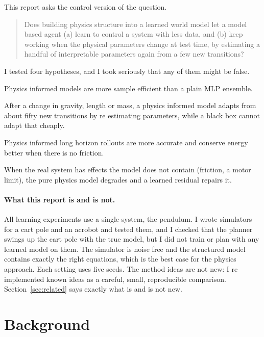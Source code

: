 \documentclass[11pt,a4paper]{article}
\begin{document}
This report asks the control version of the question.

\begin{quote}
Does building physics structure into a learned world model let a model based agent (a) learn to control a system with less data, and (b) keep working when the physical parameters change at test time, by estimating a handful of interpretable parameters again from a few new transitions?
\end{quote}

I tested four hypotheses, and I took seriously that any of them might be false.
\begin{description}[leftmargin=2.2em,style=nextline]
\item[H1] Physics informed models are more sample efficient than a plain MLP ensemble.
\item[H2] After a change in gravity, length or mass, a physics informed model adapts from about fifty new transitions by re estimating parameters, while a black box cannot adapt that cheaply.
\item[H3] Physics informed long horizon rollouts are more accurate and conserve energy better when there is no friction.
\item[H4] When the real system has effects the model does not contain (friction, a motor limit), the pure physics model degrades and a learned residual repairs it.
\end{description}

\paragraph{What this report is and is not.} All learning experiments use a single system, the pendulum. I wrote simulators for a cart pole and an acrobot and tested them, and I checked that the planner swings up the cart pole with the true model, but I did not train or plan with any learned model on them. The simulator is noise free and the structured model contains exactly the right equations, which is the best case for the physics approach. Each setting uses five seeds. The method ideas are not new: I re implemented known ideas as a careful, small, reproducible comparison. Section~\ref{sec:related} says exactly what is and is not new.

\section{Background}
\end{document}
